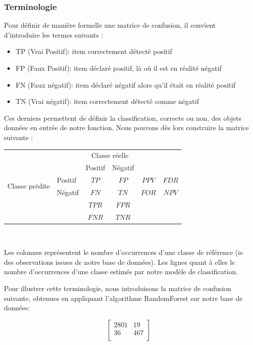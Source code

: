 \documentclass[a4paper]{report}
\begin{document}
\subsubsection{Terminologie}
Pour définir de manière formelle une matrice de confusion, il convient d'introduire les termes suivants : 
\begin{itemize}
\item TP (Vrai Positif): item correctement détecté positif 
\item FP (Faux Positif): item déclaré positif, là où il est en réalité négatif
\item FN (Faux négatif): item déclaré négatif alors qu'il était en réalité positif
\item TN (Vrai négatif): item correctement détecté comme négatif
\end{itemize}
\medskip
Ces derniers permettent de définir la classification, correcte ou non, des objets données en entrée de notre fonction. Nous pouvons dès lors construire la matrice suivante : 

\begin{tabular}{ l | l | c | c | c c}
\multicolumn{2}{c}{} & \multicolumn{2}{c}{Classe réelle} & \\
\cline{3-4}
\multicolumn{2}{c|}{} & Positif & Négatif \\
\cline{2-4}
\multirow{2}{*}{Classe prédite} & Positif & $TP$ & $FP$ & $PPV$ & $FDR$ \\
\cline{2-4}
& Négatif & $FN$ & $TN$ & $FOR$ & $NPV$ \\
\cline{2-4}
\multicolumn{1}{r}{} & \multicolumn{1}{l}{} & \multicolumn{1}{c}{$TPR$} & \multicolumn{1}{c}{$FPR$} \\
\multicolumn{1}{l}{} & \multicolumn{1}{l}{} & \multicolumn{1}{c}{$FNR$} & \multicolumn{1}{c}{$TNR$} \\
\end{tabular}

~\par
Les colonnes représentent le nombre d'occurrences d'une classe de référence (ie des observations issues de notre base de données). Les lignes quant à elles le nombre d'occurrences d'une classe estimés par notre modèle de classification. 
~\par
\medskip
Pour illustrer cette terminologie, nous introduisons la matrice de confusion suivante, obtenues en appliquant l'algorithme RandomForest sur notre base de données:

$$\begin{bmatrix}
2801 & 19 \\ 
36 & 467 \\
\end{bmatrix}$$
\end{document}
